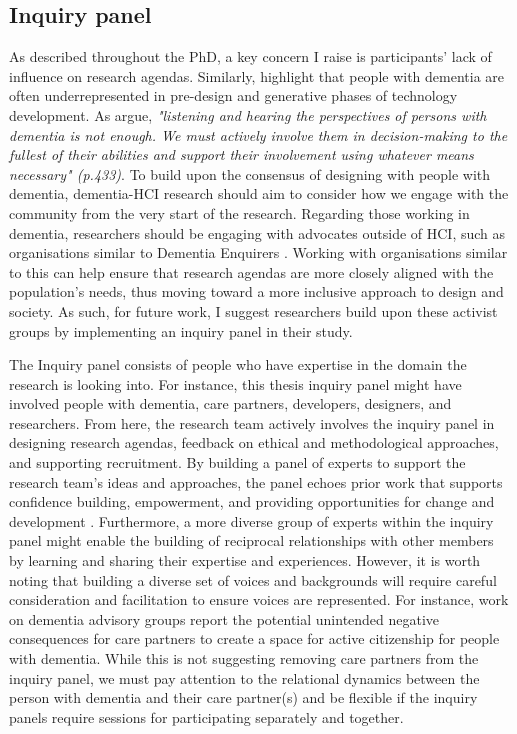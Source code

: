 \subsection{Inquiry panel}
\label{Inquiry Panel}
As described throughout the PhD, a key concern I raise is participants' lack of influence on research agendas. Similarly, \cite{suijkerbuijk_active_2019} highlight that people with dementia are often underrepresented in pre-design and generative phases of technology development. As \cite{dupuis_moving_2012} argue, \textit{"listening and hearing the perspectives of persons with dementia is not enough. We must actively involve them in decision-making to the fullest of their abilities and support their involvement using whatever means necessary" (p.433)}. To build upon the consensus of designing with people with dementia, dementia-HCI research should aim to consider how we engage with the community from the very start of the research. Regarding those working in dementia, researchers should be engaging with advocates outside of HCI, such as organisations similar to Dementia Enquirers \citep{davies2021dementia}. Working with organisations similar to this can help ensure that research agendas are more closely aligned with the population's needs, thus moving toward a more inclusive approach to design and society. As such, for future work, I suggest researchers build upon these activist groups by implementing an inquiry panel in their study.

The Inquiry panel consists of people who have expertise in the domain the research is looking into. For instance, this thesis inquiry panel might have involved people with dementia, care partners, developers, designers, and researchers. From here, the research team actively involves the inquiry panel in designing research agendas, feedback on ethical and methodological approaches, and supporting recruitment. By building a panel of experts to support the research team’s ideas and approaches, the panel echoes prior work that supports confidence building, empowerment, and providing opportunities for change and development \citep{reuter_older_2019}. Furthermore, a more diverse group of experts within the inquiry panel might enable the building of reciprocal relationships with other members by learning and sharing their expertise and experiences. However, it is worth noting that building a diverse set of voices and backgrounds will require careful consideration and facilitation to ensure voices are represented. For instance, \cite{wiersma2016creating} work on dementia advisory groups report the potential unintended negative consequences for care partners to create a space for active citizenship for people with dementia. While this is not suggesting removing care partners from the inquiry panel, we must pay attention to the relational dynamics between the person with dementia and their care partner(s) and be flexible if the inquiry panels require sessions for participating separately and together.  

